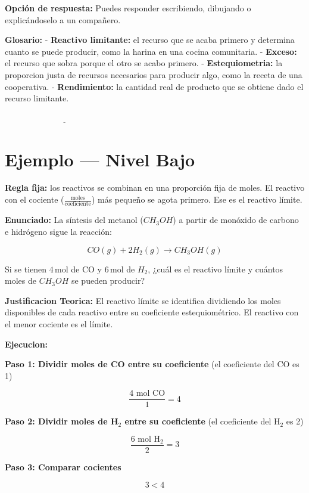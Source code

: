 \documentclass[
  spanish,
  letterpaper,
  12pt,
  oneside,
  open=any]{scrbook}
\newcommand{\setcolorsection}[2]{%
  \definecolor{currentsectionbg}{HTML}{#1}%
  \definecolor{currentsectionborder}{HTML}{#2}%
}
\begin{document}
\textbf{Opción de respuesta:} Puedes responder escribiendo, dibujando o
explicándoselo a un compañero.

\textbf{Glosario:} - \textbf{Reactivo limitante:} el recurso que se
acaba primero y determina cuanto se puede producir, como la harina en
una cocina comunitaria. - \textbf{Exceso:} el recurso que sobra porque
el otro se acabo primero. - \textbf{Estequiometria:} la proporcion justa
de recursos necesarios para producir algo, como la receta de una
cooperativa. - \textbf{Rendimiento:} la cantidad real de producto que se
obtiene dado el recurso limitante.

\(\underline{\hspace{6cm}}\)

\setcolorsection{b3d9f0}{94c4e0}

\section{Ejemplo --- Nivel Bajo}\label{ejemplo-nivel-bajo}

\textbf{Regla fija:} los reactivos se combinan en una proporción fija de
moles. El reactivo con el cociente
(\(\frac{\text{moles}}{\text{coeficiente}}\)) más pequeño se agota
primero. Ese es el reactivo límite.

\textbf{Enunciado:} La síntesis del metanol (\(CH_3OH\)) a partir de
monóxido de carbono e hidrógeno sigue la reacción:

\[CO(g) + 2H_2(g) \rightarrow CH_3OH(g)\]

Si se tienen \(4\,\text{mol}\) de CO y \(6\,\text{mol}\) de \(H_2\),
¿cuál es el reactivo límite y cuántos moles de \(CH_3OH\) se pueden
producir?

\textbf{Justificacion Teorica:} El reactivo límite se identifica
dividiendo los moles disponibles de cada reactivo entre su coeficiente
estequiométrico. El reactivo con el menor cociente es el límite.

\textbf{Ejecucion:}

\textbf{Paso 1: Dividir moles de CO entre su coeficiente} (el
coeficiente del CO es 1)

\[\frac{4 \text{ mol CO}}{1} = 4\]

\textbf{Paso 2: Dividir moles de H\(_2\) entre su coeficiente} (el
coeficiente del H\(_2\) es 2)

\[\frac{6 \text{ mol H}_2}{2} = 3\]

\textbf{Paso 3: Comparar cocientes}

\[3 < 4\]
\end{document}

